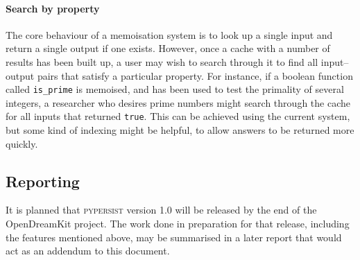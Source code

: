 \documentclass{deliverablereport}
\newcommand{\pypersist}{\textsc{pypersist}}
\begin{document}
\paragraph{Search by property}
The core behaviour of a memoisation system is to look up a single input and
return a single output if one exists.  However, once a cache with a number of
results has been built up, a user may wish to search through it to find all
input--output pairs that satisfy a particular property.  For instance, if a
boolean function called \texttt{is\_prime} is memoised, and has been used to
test the primality of several integers, a researcher who desires prime numbers
might search through the cache for all inputs that returned \texttt{true}.  This
can be achieved using the current system, but some kind of indexing might be
helpful, to allow answers to be returned more quickly.

\subsection{Reporting}
It is planned that \pypersist{} version 1.0 will be released by the end of the
OpenDreamKit project.  The work done in preparation for that release, including
the features mentioned above, may be summarised in a later report that would act
as an addendum to this document.
\end{document}
